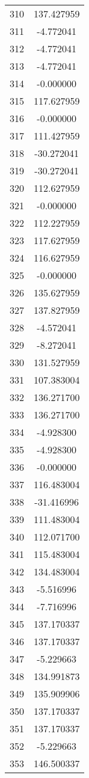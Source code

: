 \documentclass[12pt]{article}
\begin{document}
\begin{longtable}{@{}cc@{}}
310 & 137.427959 \\
311 & -4.772041 \\
312 & -4.772041 \\
313 & -4.772041 \\
314 & -0.000000 \\
315 & 117.627959 \\
316 & -0.000000 \\
317 & 111.427959 \\
318 & -30.272041 \\
319 & -30.272041 \\
320 & 112.627959 \\
321 & -0.000000 \\
322 & 112.227959 \\
323 & 117.627959 \\
324 & 116.627959 \\
325 & -0.000000 \\
326 & 135.627959 \\
327 & 137.827959 \\
328 & -4.572041 \\
329 & -8.272041 \\
330 & 131.527959 \\
331 & 107.383004 \\
332 & 136.271700 \\
333 & 136.271700 \\
334 & -4.928300 \\
335 & -4.928300 \\
336 & -0.000000 \\
337 & 116.483004 \\
338 & -31.416996 \\
339 & 111.483004 \\
340 & 112.071700 \\
341 & 115.483004 \\
342 & 134.483004 \\
343 & -5.516996 \\
344 & -7.716996 \\
345 & 137.170337 \\
346 & 137.170337 \\
347 & -5.229663 \\
348 & 134.991873 \\
349 & 135.909906 \\
350 & 137.170337 \\
351 & 137.170337 \\
352 & -5.229663 \\
353 & 146.500337 \\

\end{longtable}
\end{document}
